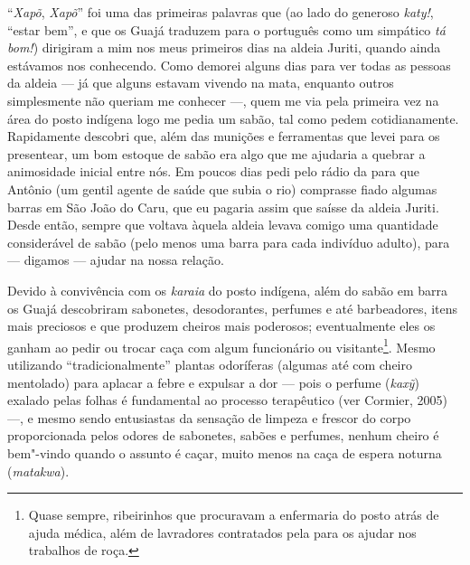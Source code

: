 ``\emph{Xapõ}, \emph{Xapõ}'' foi uma das primeiras palavras que (ao lado
do generoso \emph{katy!}, ``estar bem'', e que os Guajá traduzem para o
português como um simpático \emph{tá} \emph{bom!}) dirigiram a mim nos
meus primeiros dias na aldeia Juriti, quando ainda estávamos nos
conhecendo. Como demorei alguns dias para ver todas as pessoas da aldeia
--- já que alguns estavam vivendo na mata, enquanto outros simplesmente
não queriam me conhecer ---, quem me via pela primeira vez na área do
posto indígena logo me pedia um sabão, tal como pedem cotidianamente.
Rapidamente descobri que, além das munições e ferramentas que levei para
os presentear, um bom estoque de sabão era algo que me ajudaria a
quebrar a animosidade inicial entre nós. Em poucos dias pedi pelo rádio
da  para que Antônio (um gentil agente de saúde que subia o rio)
comprasse fiado algumas barras em São João do Caru, que eu pagaria assim
que saísse da aldeia Juriti. Desde então, sempre que voltava àquela
aldeia levava comigo uma quantidade considerável de sabão (pelo menos
uma barra para cada indivíduo adulto), para --- digamos --- ajudar na nossa
relação.

Devido à convivência com os \emph{karaia} do posto indígena, além do
sabão em barra os Guajá descobriram sabonetes, desodorantes, perfumes e
até barbeadores, itens mais preciosos e que produzem cheiros mais
poderosos; eventualmente eles os ganham ao pedir ou trocar caça com
algum funcionário ou visitante\footnote{Quase sempre, ribeirinhos que
  procuravam a enfermaria do posto atrás de ajuda médica, além de
  lavradores contratados pela  para os ajudar nos trabalhos de
  roça.}. Mesmo utilizando ``tradicionalmente'' plantas odoríferas
(algumas até com cheiro mentolado) para aplacar a febre e expulsar a dor
--- pois o perfume (\emph{kaxỹ}) exalado pelas folhas é fundamental ao
processo terapêutico (ver Cormier, 2005) ---, e mesmo sendo entusiastas da
sensação de limpeza e frescor do corpo proporcionada pelos odores de
sabonetes, sabões e perfumes, nenhum cheiro é bem"-vindo quando o assunto
é caçar, muito menos na caça de espera noturna (\emph{matakwa}).

